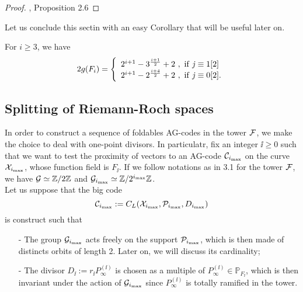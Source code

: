 \documentclass[10pt]{article}
\begin{document}
\s

\begin{proof}
\cite{NOQ}, Proposition 2.6
\end{proof}

\s

Let us conclude this sectin with an easy Corollary that will be useful later on.

\s

\begin{corollary} \label{genus}
For $i\geq 3$, we have
\begin{equation*}
2g(F_i) = \left\{ \begin{array}{ll}
2^{i+1}-3^{\frac{i+1}{2}}+2 \ , \ \rm if \ \it j \equiv \rm 1[2] \\
2^{i+1}-2^{\frac{i+4}{2}} +2\ , \ \rm if \ \it j \equiv \rm 0[2].
\end{array}
\right.
\end{equation*}
\end{corollary}


\s

\subsection{Splitting of Riemann-Roch spaces}

\s

In order to construct a sequence of foldables AG-codes in the tower $\mathcal{F}$, we make the choice to deal with one-point divisors. In particulatr, fix an integer $\ii \geq 0$ such that we want to test the proximity of vectors to an AG-code $\mathcal{C}_{i_{\rm{max}}}$ on the curve $\mathcal{X}_{i_{\rm{max}}}$, whose function field is $F_{\ii}$. If we follow notations as in 3.1 for the tower $\mathcal{F}$, we have $\mathcal{G} \simeq \mathbb{Z}/2\mathbb{Z}$ and $\mathcal{G}_{i_{\rm{max}}} \simeq \mathbb{Z}/2^{i_{\rm{max}}}\mathbb{Z}$. \\ 
Let us suppose that the big code 
\[\mathcal{C}_{i_{\rm{max}}} := C_L(\mathcal{X}_{i_{\rm{max}}},\mathcal{P}_{i_{\rm{max}}},D_{i_{\rm{max}}})\]
is construct such that 
\begin{itemize}
\item[-] The group $\mathcal{G}_{i_{\rm{max}}}$ acts freely on the support $\mathcal{P}_{i_{\rm{max}}}$, which is then made of distincts orbits of length 2. Later on, we will discuss its cardinality; 
\item[-] The divisor $D_{\ii} := r_{\ii}P_{\infty}^{(\ii)}$ is chosen as a multiple of $P_{\infty}^{(\ii)} \in \mathbb{P}_{F_{\ii}}$, which is then invariant under the action of $\mathcal{G}_{i_{\rm{max}}}$ since $P_{\infty}^{(\ii)}$ is totally ramified in the tower.
\end{itemize}
\end{document}
